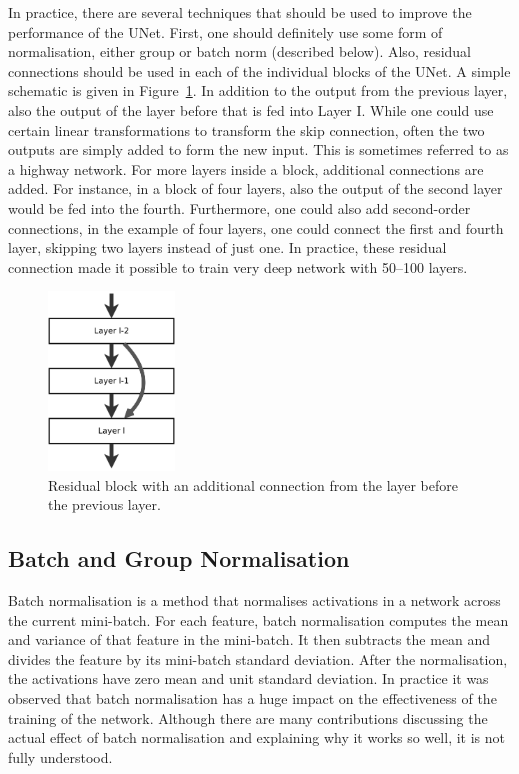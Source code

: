 In practice, there are several techniques that should be used to improve the
performance of the UNet. First, one should definitely use some form of
normalisation, either group or batch norm (described below). Also, residual
connections should be used in each of the individual blocks of the UNet. A
simple schematic is given in Figure~\ref{fig:resblock}. In addition to the
output from the previous layer, also the output of the layer before that is fed
into Layer I. While one could use certain linear transformations to transform
the skip connection, often the two outputs are simply added to form the new
input. This is sometimes referred to as a highway network. For more layers
inside a block, additional connections are added. For instance, in a block of
four layers, also the output of the second layer would be fed into the fourth.
Furthermore, one could also add second-order connections, \ie in the example of
four layers, one could connect the first and fourth layer, skipping two layers
instead of just one. In practice, these residual connection made it possible to
train very deep network with 50--100 layers.

\begin{figure}[htpb]
  \centering
  \includegraphics[width=0.3\textwidth,angle=90,origin=c]{Figures/resblock}
  \caption{Residual block with an additional connection from the layer before
    the previous layer.}%
  \label{fig:resblock}
\end{figure}

\subsection*{Batch and Group Normalisation}
Batch normalisation is a method that normalises activations in a network across
the current mini-batch. For each feature, batch normalisation computes the mean
and variance of that feature in the mini-batch. It then subtracts the mean and
divides the feature by its mini-batch standard deviation. After the
normalisation, the activations have zero mean and unit standard deviation. In
practice it was observed that batch normalisation has a huge impact on the
effectiveness of the training of the network. Although there are many
contributions discussing the actual effect of batch normalisation and explaining
why it works so well, it is not fully understood.

